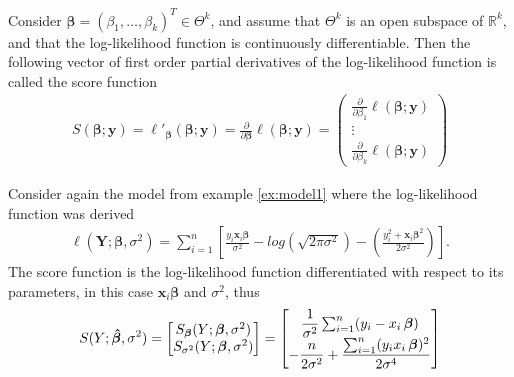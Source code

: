 \begin{definition}
\label{def:score_function}
Consider $\boldsymbol{\beta} = (\beta_1, \ldots, \beta_k)^T \in \Theta^k$, and assume that $\Theta^k$ is an open subspace of $\mathbb{R}^k$, and that the log-likelihood function is continuously differentiable. 
Then the following vector of first order partial derivatives of the log-likelihood function is called the score function
\begin{align*}
    S(\boldsymbol{\beta}; \textbf{y}) = \ell'_{\boldsymbol{\beta}}(\boldsymbol{\beta}; \textbf{y}) = \frac{\partial}{\partial \boldsymbol{\beta}} \ell (\boldsymbol{\beta}; \textbf{y}) = 
    \begin{pmatrix}
        \frac{\partial}{\partial \beta_1}\ell (\boldsymbol{\beta}; \textbf{y}) \\
        \vdots \\
        \frac{\partial}{\partial \beta_k}\ell (\boldsymbol{\beta}; \textbf{y})
    \end{pmatrix}
\end{align*}
\end{definition}
\begin{example}
Consider again the model from example \ref{ex:model1} where the log-likelihood function was derived
\begin{align*}
   \ell(\textbf{Y};\boldsymbol{\beta}, \sigma^2) = \sum_{i = 1}^n \left[\frac{y_i \textbf{x}_i\boldsymbol{\beta}}{\sigma^2} - log\left( \sqrt{2 \pi \sigma^2}\right) - \left( \frac{y_i^2 + \textbf{x}_i\boldsymbol{\beta}^2}{2\sigma^2} \right) \right].
\end{align*}
The score function is the log-likelihood function differentiated with respect to its parameters, in this case $\textbf{x}_i\boldsymbol{\beta}$ and $\sigma^2$, thus
\begin{align*}
    S(Y; \operatorname{\boldsymbol{\hat{\beta}}}, \sigma^2) = 
    \begin{bmatrix}
        S_{\operatorname{\boldsymbol{\beta}}} (Y; \operatorname{\boldsymbol{\beta}}, \sigma^2) \\
        S_{\sigma^2}(Y; \operatorname{\boldsymbol{\beta}}, \sigma^2)
    \end{bmatrix}
    =
    \begin{bmatrix}
        \dfrac{1}{\sigma^2} \sum_{i=1}^n (y_i - x_i \operatorname{\boldsymbol{\beta}}) \\
        - \dfrac{n}{2 \sigma^2} + \dfrac{\sum_{i=1}^n (y_i x_i \operatorname{\boldsymbol{\beta}})^2}{2 \sigma^4}
    \end{bmatrix}
\end{align*}
\end{example}
